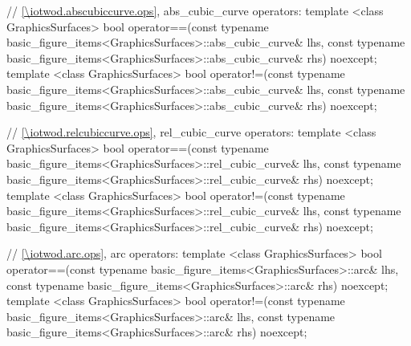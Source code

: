 \begin{codeblock}
{  // \ref{\iotwod.abscubiccurve.ops}, abs_cubic_curve operators:
  template <class GraphicsSurfaces>
  bool operator==(const typename basic_figure_items<GraphicsSurfaces>::abs_cubic_curve& lhs,
    const typename basic_figure_items<GraphicsSurfaces>::abs_cubic_curve& rhs) noexcept;
  template <class GraphicsSurfaces>
  bool operator!=(const typename basic_figure_items<GraphicsSurfaces>::abs_cubic_curve& lhs,
    const typename basic_figure_items<GraphicsSurfaces>::abs_cubic_curve& rhs) noexcept;

  // \ref{\iotwod.relcubiccurve.ops}, rel_cubic_curve operators:
  template <class GraphicsSurfaces>
  bool operator==(const typename basic_figure_items<GraphicsSurfaces>::rel_cubic_curve& lhs,
    const typename basic_figure_items<GraphicsSurfaces>::rel_cubic_curve& rhs) noexcept;
  template <class GraphicsSurfaces>
  bool operator!=(const typename basic_figure_items<GraphicsSurfaces>::rel_cubic_curve& lhs,
    const typename basic_figure_items<GraphicsSurfaces>::rel_cubic_curve& rhs) noexcept;

  // \ref{\iotwod.arc.ops}, arc operators:
  template <class GraphicsSurfaces>
  bool operator==(const typename basic_figure_items<GraphicsSurfaces>::arc& lhs,
    const typename basic_figure_items<GraphicsSurfaces>::arc& rhs) noexcept;
  template <class GraphicsSurfaces>
  bool operator!=(const typename basic_figure_items<GraphicsSurfaces>::arc& lhs,
    const typename basic_figure_items<GraphicsSurfaces>::arc& rhs) noexcept;
}
\end{codeblock}